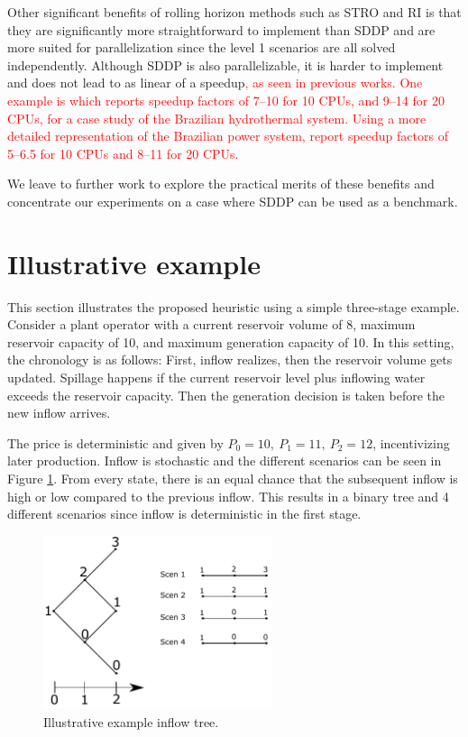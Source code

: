 Other significant benefits of rolling horizon methods such as STRO and RI is that they are significantly more straightforward to implement than SDDP and are more suited for parallelization since the level 1 scenarios are all solved independently. Although SDDP is also parallelizable, it is harder to implement and does not lead to as linear of a speedup\textcolor{red}{, as seen in previous works.}
 \textcolor{red}{One example is \cite{AvPL21} which reports speedup factors of 7--10 for 10 CPUs, and 9--14 for 20 CPUs, for a case study of the Brazilian hydrothermal system. Using a more detailed representation of the Brazilian power system, \cite{MaDB21} report speedup factors of 5--6.5 for 10  CPUs and 8--11 for 20 CPUs.}

We leave to further work to explore the practical merits of these benefits and concentrate our experiments on a case where SDDP can be used as a benchmark.




\section{Illustrative example}
\label{section: illustrative example}
This section illustrates the proposed heuristic using a simple three-stage example. Consider a plant operator with a current reservoir volume of 8, maximum reservoir capacity of 10, and maximum generation capacity of 10. In this setting, the chronology is as follows: First, inflow realizes, then the reservoir volume gets updated. Spillage happens if the current reservoir level plus inflowing water exceeds the reservoir capacity. Then the generation decision is taken before the new inflow arrives. 

The price is deterministic and given by $P_0 = 10, \ P_1 = 11, \ P_2 = 12$, incentivizing later production. Inflow is stochastic and the different scenarios can be seen in Figure \ref{fig: instance}. From every state, there is an equal chance that the subsequent inflow is high or low compared to the previous inflow. This results in a binary tree and 4 different scenarios since inflow is deterministic in the first stage. 

 \begin{figure}[H]
    \centering
    \includegraphics[width=0.6\textwidth]{RH_instance.pdf}
    \caption{Illustrative example inflow tree.}
    \label{fig: instance}
\end{figure} 

